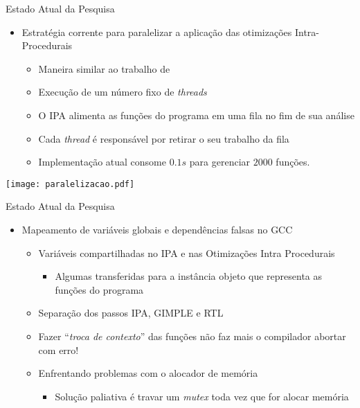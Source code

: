 \begin{frame}{Estado Atual da Pesquisa}
    \begin{itemize}
        \item Estratégia corrente para paralelizar a aplicação das otimizações Intra-Procedurais
            \begin{itemize}
                \item Maneira similar ao trabalho de \cite{wortman1992}
                \item Execução de um número fixo de \textit{threads}
                \item O IPA alimenta as funções do programa em uma fila no fim de sua análise
                \item Cada \textit{thread} é responsável por retirar o seu trabalho da fila
                \item Implementação atual consome $0.1s$ para gerenciar $2000$ funções.
    \end{itemize}
\end{itemize}

 \centering
 \texttt{[image: paralelizacao.pdf]}
\end{frame}

\begin{frame}{Estado Atual da Pesquisa}
    \begin{itemize}
        \item Mapeamento de variáveis globais e dependências falsas no GCC
            \begin{itemize}
                \item Variáveis compartilhadas no IPA e nas Otimizações Intra Procedurais
                \begin{itemize}
                    \item Algumas transferidas para a instância objeto que representa as funções do programa
                \end{itemize}
                \item Separação dos passos IPA, GIMPLE e RTL
                \item Fazer ``\textit{troca de contexto}'' das funções não faz mais o compilador abortar com erro!
                \item Enfrentando problemas com o alocador de memória
                \begin{itemize}
                    \item Solução paliativa é travar um \textit{mutex} toda vez que for alocar memória
                \end{itemize}
    \end{itemize}
\end{itemize}
\end{frame}

